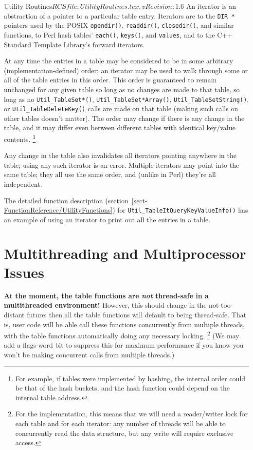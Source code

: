 \begin{cactuspart}{3}{Utility Routines}{$RCSfile: UtilityRoutines.tex,v $}{$Revision: 1.6 $}
An iterator is an abstraction of a pointer to a particular table entry.
Iterators are to the \verb|DIR *| pointers used by the POSIX
\verb|opendir()|, \verb|readdir()|, \verb|closedir()|, and similar
functions, to Perl hash tables' \verb|each()|, \verb|keys()|,
and \verb|values|, and to the C++ Standard Template Library's
forward iterators.

At any time the entries in a table may be considered to be in some
arbitrary (implementation-defined) order; an iterator may be used to
walk through some or all of the table entries in this order.  This
order is guaranteed to remain unchanged for any given table so long
as no changes are made to that table, \ie{} so long as no
\verb|Util_TableSet*()|, \verb|Util_TableSet*Array()|,
\verb|Util_TableSetString()|, or \verb|Util_TableDeleteKey()| calls
are made on that table (making such calls on other tables doesn't matter).
The order may change if there is any change in the table, and it
may differ even between different tables with identical key/value
contents.%
\footnote{%
	 For example, if tables were implemented by hashing,
	 the internal order could be that of the hash buckets,
	 and the hash function could depend on the internal
	 table address.
	 }%
{}  

Any change in the table also invalidates all iterators pointing
anywhere in the table; using any such iterator is an error.
Multiple iterators may point into the same table; they all use the
same order, and (unlike in Perl) they're all independent.

The detailed function description
(section~\ref{sect-FunctionReference/UtilityFunctions})
for \verb|Util_TableItQueryKeyValueInfo()| has an example of
using an iterator to print out all the entries in a table.


\section{Multithreading and Multiprocessor Issues}

{\bf At the moment, the table functions are {\em not\/} thread-safe
in a multithreaded environment!}  However, this should change in
the not-too-distant future: then all the table functions will default
to being thread-safe.  That is, user code will be able call these
functions concurrently from multiple threads, with the table functions
automatically doing any necessary locking.%
\footnote{%
	 For the implementation, this means that we will need a
	 reader/writer lock for each table and for each iterator:
	 any number of threads will be able to concurrently read
	 the data structure, but any write will require exclusive
	 access.
	 }%
{}  (We may add a flags-word bit to suppress this for maximum
performance if you know you won't be making concurrent calls from
multiple threads.)


\end{cactuspart}
